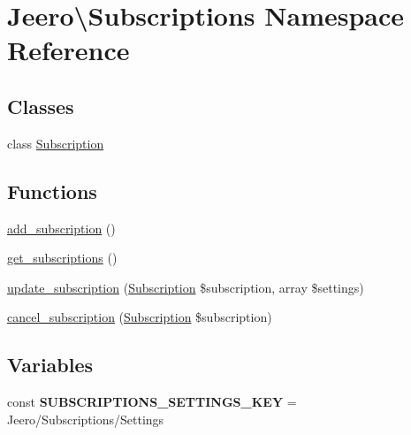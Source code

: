 \hypertarget{namespaceJeero_1_1Subscriptions}{}\section{Jeero\textbackslash{}Subscriptions Namespace Reference}
\label{namespaceJeero_1_1Subscriptions}
\subsection*{Classes}
\begin{DoxyCompactItemize}
\item 
class \hyperlink{classJeero_1_1Subscriptions_1_1Subscription}{Subscription}
\end{DoxyCompactItemize}
\subsection*{Functions}
\begin{DoxyCompactItemize}
\item 
\hyperlink{namespaceJeero_1_1Subscriptions_a7fefeb0c9fc00b9b47bd9da69da6ecbd}{add\+\_\+subscription} ()
\item 
\hyperlink{namespaceJeero_1_1Subscriptions_af143e8607705a82067cfe4082cf5f3a5}{get\+\_\+subscriptions} ()
\item 
\hyperlink{namespaceJeero_1_1Subscriptions_a02cb69ca8b573c4397759a6ddde6af28}{update\+\_\+subscription} (\hyperlink{classJeero_1_1Subscriptions_1_1Subscription}{Subscription} \$subscription, array \$settings)
\item 
\hyperlink{namespaceJeero_1_1Subscriptions_a9d1e85f0c5a276290e41bc794ae9da66}{cancel\+\_\+subscription} (\hyperlink{classJeero_1_1Subscriptions_1_1Subscription}{Subscription} \$subscription)
\end{DoxyCompactItemize}
\subsection*{Variables}
\begin{DoxyCompactItemize}
\item 
\mbox{\label{namespaceJeero_1_1Subscriptions_ab76755fd13084faaeeeb80488e71a86f}} 
const {\bfseries S\+U\+B\+S\+C\+R\+I\+P\+T\+I\+O\+N\+S\+\_\+\+S\+E\+T\+T\+I\+N\+G\+S\+\_\+\+K\+EY} = \textquotesingle{}Jeero/Subscriptions/Settings\textquotesingle{}
\end{DoxyCompactItemize}



